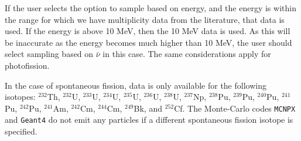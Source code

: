 If the user selects the option to sample based on energy, and
the energy is within the range for which we have multiplicity 
data from the literature, that data is used.  If the energy is above 10 MeV, then 
the 10 MeV data is used. As this will be inaccurate as the energy becomes much higher
than 10 MeV, the user should select sampling based on $\bar{\nu}$ in this case. 
The same considerations apply for photofission.

In the case of spontaneous fission, data is only available 
for the following isotopes: $^{232}$Th, $^{232}$U, 
$^{233}$U, $^{234}$U, $^{235}$U, $^{236}$U, $^{238}$U, 
$^{237}$Np, $^{238}$Pu, $^{239}$Pu, $^{240}$Pu, $^{241}$Pu, 
$^{242}$Pu, $^{241}$Am, $^{242}$Cm, $^{244}$Cm, $^{249}$Bk, 
and $^{252}$Cf. 
The Monte-Carlo codes {\tt MCNPX} and {\tt Geant4} do not emit any particles if a different spontaneous fission 
isotope is specified.



%


